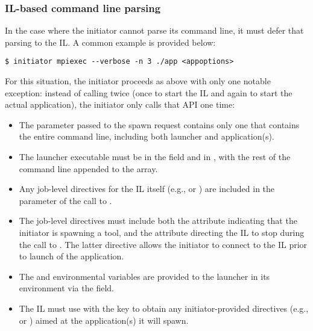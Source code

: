\subsubsection{\ac{IL}-based command line parsing}
\label{chap:api_tools:indirect:tool}

In the case where the initiator cannot parse its command line, it must defer that parsing to the \ac{IL}. A common example is provided below:

\begin{verbatim}
$ initiator mpiexec --verbose -n 3 ./app <appoptions>
\end{verbatim}

For this situation, the initiator proceeds as above with only one notable exception: instead of calling  twice (once to start the \ac{IL} and again to start the actual application), the initiator only calls that \ac{API} one time:

\begin{itemize}
    \item The  parameter passed to the spawn request contains only one  that contains the entire command line, including both launcher and application(s).
    \item The launcher executable must be in the  field and in , with the rest of the command line appended to the  array.
    \item Any job-level directives for the \ac{IL} itself (e.g.,  or ) are included in the  parameter of the call to .
    \item The job-level directives must include both the  attribute indicating that the initiator is spawning a tool, and the  attribute directing the \ac{IL} to stop during the call to . The latter directive allows the initiator to connect to the \ac{IL} prior to launch of the application.
    \item The  and  environmental variables are provided to the launcher in its environment via the  field.
    \item The \ac{IL} must use  with the  key to obtain any initiator-provided directives (e.g.,  or ) aimed at the application(s) it will spawn.
\end{itemize}


